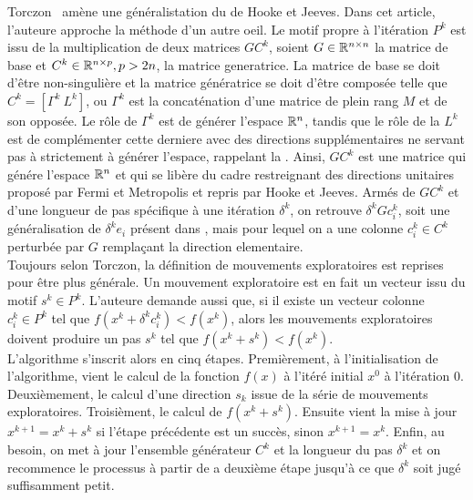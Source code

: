 Torczon~\cite{Torc97a} amène une généralistation du \PS{} de Hooke et Jeeves. Dans cet article, l'auteure approche la méthode d'un autre oeil. Le motif propre à l'itération $P^k$ est issu de la multiplication de deux matrices $GC^k$, soient $G \in \mathbb{R}^{n\times n}$ la matrice de base et $C^k \in \mathbb{R}^{n\times p}, p > 2n$, la matrice generatrice. La matrice de base se doit d'être non-singulière et la matrice génératrice se doit d'être composée telle que $C^k = [\Gamma^k~ L^k]$, ou $\Gamma^k$ est la concaténation d'une matrice de plein rang $M$ et de son opposée. Le rôle de $\Gamma^k$ est de générer l'espace $\mathbb{R} ^n$, tandis que le rôle de la $L^k$ est de complémenter cette derniere avec des directions supplémentaires ne servant pas à strictement à générer l'espace, rappelant la \SEARCH{}. Ainsi, $GC^k$ est une matrice qui génére l'espace $\mathbb{R}^n$ et qui se libère du cadre restreignant des directions unitaires proposé par Fermi et Metropolis et repris par Hooke et Jeeves. Armés de $GC^k$ et d'une longueur de pas spécifique à une itération $\delta^k$, on retrouve $\delta^k Gc^k_i$, soit une généralisation de $\delta^k e_i$ présent dans \CS{}, mais pour lequel on a une colonne $c^k_i\in C^k$ perturbée par $G$ remplaçant la direction elementaire.\\
Toujours selon Torczon, la définition de mouvements exploratoires est reprises pour être plus générale. Un mouvement exploratoire est en fait un vecteur issu du motif $s^k \in P^k$. L'auteure demande aussi que, si il existe un vecteur colonne $c^k_i \in P^k$ tel que $f(x^k + \delta^k c_i^k) < f(x^k)$, alors les mouvements exploratoires doivent produire un pas $s^k$ tel que $f(x^k+s^k) < f(x^k)$.\\
L'algorithme s'inscrit alors en cinq étapes. Premièrement, à l'initialisation de l'algorithme, vient le calcul de la fonction $f(x)$ à l'itéré initial $x^0$ à l'itération $0$. Deuxièmement, le calcul d'une direction $s_k$ issue de la série de mouvements exploratoires. Troisièment, le calcul de $f(x^k + s^k)$. Ensuite vient la mise à jour $x^{k+1} = x^k +s^k$ si l'étape précédente est un succès, sinon $x^{k+1} = x^k$. Enfin, au besoin, on  met à jour l'ensemble générateur $C^k$ et la longueur du pas $\delta^k$ et on recommence le processus à partir de a deuxième étape jusqu'à ce que $\delta^k$ soit jugé suffisamment petit.\\
